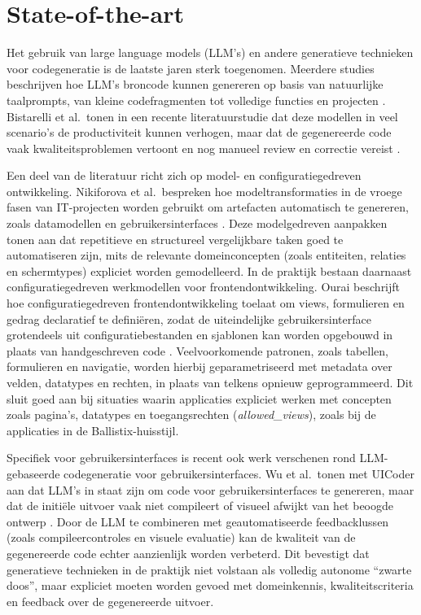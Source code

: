 \section{State-of-the-art}
Het gebruik van large language models (LLM's) en andere generatieve technieken voor codegeneratie is de laatste jaren sterk toegenomen. Meerdere studies beschrijven hoe LLM's broncode kunnen genereren op basis van natuurlijke taalprompts, van kleine codefragmenten tot volledige functies en projecten \parencite{Zan2023NL2Code,Jiang2024CodeGenSurvey}. Bistarelli et al.\ tonen in een recente literatuurstudie dat deze modellen in veel scenario's de productiviteit kunnen verhogen, maar dat de gegenereerde code vaak kwaliteitsproblemen vertoont en nog manueel review en correctie vereist \parencite{Bistarelli2025LLMCodeReview}.

Een deel van de literatuur richt zich op model- en configuratiegedreven ontwikkeling. Nikiforova et al.\ bespreken hoe modeltransformaties in de vroege fasen van IT-projecten worden gebruikt om artefacten automatisch te genereren, zoals datamodellen en gebruikersinterfaces \parencite{Nikiforova2025}. Deze modelgedreven aanpakken tonen aan dat repetitieve en structureel vergelijkbare taken goed te automatiseren zijn, mits de relevante domeinconcepten (zoals entiteiten, relaties en schermtypes) expliciet worden gemodelleerd. In de praktijk bestaan daarnaast configuratiegedreven werkmodellen voor frontendontwikkeling. Ourai beschrijft hoe configuratiegedreven frontendontwikkeling toelaat om views, formulieren en gedrag declaratief te definiëren, zodat de uiteindelijke gebruikersinterface grotendeels uit configuratiebestanden en sjablonen kan worden opgebouwd in plaats van handgeschreven code \parencite{Ourai2025}. Veelvoorkomende patronen, zoals tabellen, formulieren en navigatie, worden hierbij geparametriseerd met metadata over velden, datatypes en rechten, in plaats van telkens opnieuw geprogrammeerd. Dit sluit goed aan bij situaties waarin applicaties expliciet werken met concepten zoals pagina's, datatypes en toegangsrechten (\emph{allowed\_views}), zoals bij de applicaties in de Ballistix-huisstijl.

Specifiek voor gebruikersinterfaces is recent ook werk verschenen rond LLM-gebaseerde codegeneratie voor gebruikersinterfaces. Wu et al.\ tonen met UICoder aan dat LLM's in staat zijn om code voor gebruikersinterfaces te genereren, maar dat de initiële uitvoer vaak niet compileert of visueel afwijkt van het beoogde ontwerp \parencite{Wu2024UICoder}. Door de LLM te combineren met geautomatiseerde feedbacklussen (zoals compileercontroles en visuele evaluatie) kan de kwaliteit van de gegenereerde code echter aanzienlijk worden verbeterd. Dit bevestigt dat generatieve technieken in de praktijk niet volstaan als volledig autonome ``zwarte doos'', maar expliciet moeten worden gevoed met domeinkennis, kwaliteitscriteria en feedback over de gegenereerde uitvoer.


